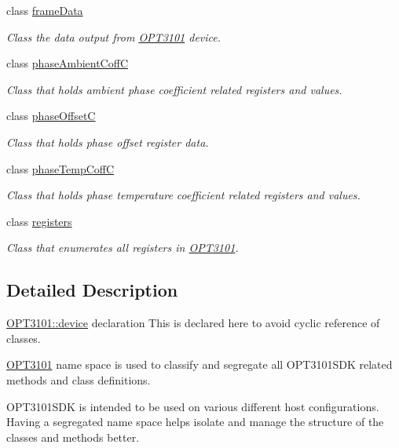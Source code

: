\begin{DoxyCompactItemize}
class \mbox{\hyperlink{class_o_p_t3101_1_1frame_data}{frame\+Data}}
\begin{DoxyCompactList}\small\item\em Class the data output from \mbox{\hyperlink{namespace_o_p_t3101}{O\+P\+T3101}} device. \end{DoxyCompactList}\item 
class \mbox{\hyperlink{class_o_p_t3101_1_1phase_ambient_coff_c}{phase\+Ambient\+CoffC}}
\begin{DoxyCompactList}\small\item\em Class that holds ambient phase coefficient related registers and values. \end{DoxyCompactList}\item 
class \mbox{\hyperlink{class_o_p_t3101_1_1phase_offset_c}{phase\+OffsetC}}
\begin{DoxyCompactList}\small\item\em Class that holds phase offset register data. \end{DoxyCompactList}\item 
class \mbox{\hyperlink{class_o_p_t3101_1_1phase_temp_coff_c}{phase\+Temp\+CoffC}}
\begin{DoxyCompactList}\small\item\em Class that holds phase temperature coefficient related registers and values. \end{DoxyCompactList}\item 
class \mbox{\hyperlink{class_o_p_t3101_1_1registers}{registers}}
\begin{DoxyCompactList}\small\item\em Class that enumerates all registers in \mbox{\hyperlink{namespace_o_p_t3101}{O\+P\+T3101}}. \end{DoxyCompactList}\end{DoxyCompactItemize}


\subsection{Detailed Description}
\mbox{\hyperlink{class_o_p_t3101_1_1device}{O\+P\+T3101\+::device}} declaration This is declared here to avoid cyclic reference of classes. 

\mbox{\hyperlink{namespace_o_p_t3101}{O\+P\+T3101}} name space is used to classify and segregate all O\+P\+T3101\+S\+DK related methods and class definitions.

O\+P\+T3101\+S\+DK is intended to be used on various different host configurations. Having a segregated name space helps isolate and manage the structure of the classes and methods better. 